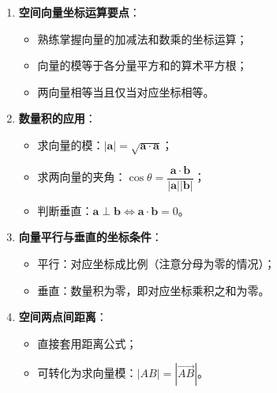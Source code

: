 \documentclass[11pt]{ctexrep}
\begin{document}
\begin{enumerate}
    \item \textbf{空间向量坐标运算要点}：
    \begin{itemize}
        \item 熟练掌握向量的加减法和数乘的坐标运算；
        \item 向量的模等于各分量平方和的算术平方根；
        \item 两向量相等当且仅当对应坐标相等。
    \end{itemize}
    
    \item \textbf{数量积的应用}：
    \begin{itemize}
        \item 求向量的模：$|\boldsymbol{a}| = \sqrt{\boldsymbol{a} \cdot \boldsymbol{a}}$；
        \item 求两向量的夹角：$\cos\theta = \dfrac{\boldsymbol{a} \cdot \boldsymbol{b}}{|\boldsymbol{a}||\boldsymbol{b}|}$；
        \item 判断垂直：$\boldsymbol{a} \perp \boldsymbol{b} \Leftrightarrow \boldsymbol{a} \cdot \boldsymbol{b} = 0$。
    \end{itemize}
    
    \item \textbf{向量平行与垂直的坐标条件}：
    \begin{itemize}
        \item 平行：对应坐标成比例（注意分母为零的情况）；
        \item 垂直：数量积为零，即对应坐标乘积之和为零。
    \end{itemize}
    
    \item \textbf{空间两点间距离}：
    \begin{itemize}
        \item 直接套用距离公式；
        \item 可转化为求向量模：$|AB| = |\overrightarrow{AB}|$。
    \end{itemize}
\end{enumerate}
\end{document}
